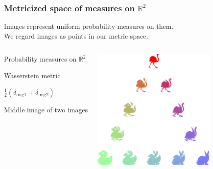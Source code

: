 \documentclass[aspectratio=169]{beamer}
\begin{document}
\begin{frame}
	\frametitle{Metricized space of measures on $\mathbb{R}^2$ }
	Images represent uniform probability measures on them.\\
	We regard images as points in our metric space.
	\begin{columns}
		\begin{description}[explanation]
			\item[Space] Probability measures on $\mathbb{R}^2$
			\item[Metric] Wasserstein metric
			\item[Measure] $\frac{1}{2}(\delta_{\text{img1}} + \delta_{\text{img2}})$
			\item[Barycenter] Middle image of two images
		\end{description}
		\centering
		\includegraphics[height=6cm]{barycenter.png}
	\end{columns}
\end{frame}
\end{document}
